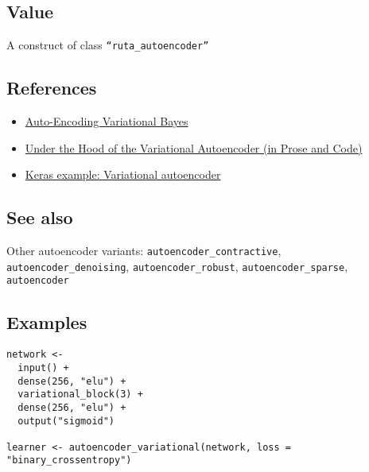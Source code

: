 \hypertarget{value}{\subsection{\texorpdfstring{\protect\hyperlink{value}{}Value}{Value}}\label{value}}

A construct of class \texttt{``ruta\_autoencoder''}

\hypertarget{references}{\subsection{\texorpdfstring{\protect\hyperlink{references}{}References}{References}}\label{references}}

\begin{itemize}
\item
  \href{https://arxiv.org/abs/1312.6114}{Auto-Encoding Variational
  Bayes}
\item
  \href{http://blog.fastforwardlabs.com/2016/08/22/under-the-hood-of-the-variational-autoencoder-in.html}{Under
  the Hood of the Variational Autoencoder (in Prose and Code)}
\item
  \href{https://keras.rstudio.com/articles/examples/variational_autoencoder.html}{Keras
  example: Variational autoencoder}
\end{itemize}

\hypertarget{see-also}{\subsection{\texorpdfstring{\protect\hyperlink{see-also}{}See
also}{See also}}\label{see-also}}

Other autoencoder variants: \texttt{autoencoder\_contractive},
\texttt{autoencoder\_denoising}, \texttt{autoencoder\_robust},
\texttt{autoencoder\_sparse}, \texttt{autoencoder}

\hypertarget{examples}{\subsection{\texorpdfstring{\protect\hyperlink{examples}{}Examples}{Examples}}\label{examples}}

\begin{verbatim}
network <-
  input() +
  dense(256, "elu") +
  variational_block(3) +
  dense(256, "elu") +
  output("sigmoid")

learner <- autoencoder_variational(network, loss = "binary_crossentropy")
\end{verbatim}

